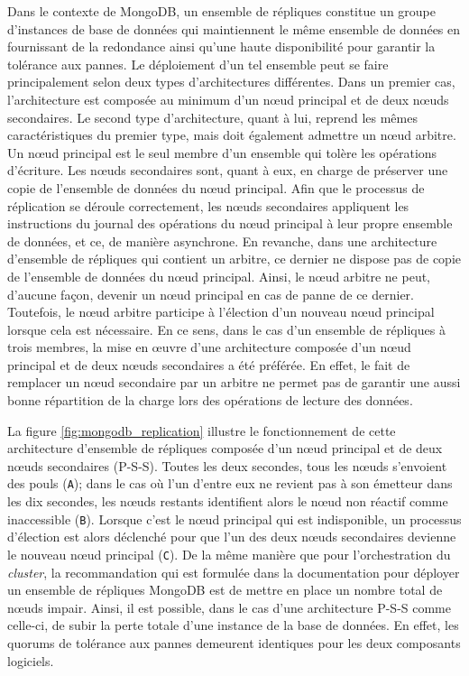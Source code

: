 Dans le contexte de MongoDB, un ensemble de répliques constitue un groupe d'instances de base de données qui maintiennent le même ensemble de données en fournissant de la redondance ainsi qu'une haute disponibilité pour garantir la tolérance aux pannes. Le déploiement d'un tel ensemble peut se faire principalement selon deux types d'architectures différentes. Dans un premier cas, l'architecture est composée au minimum d'un n\oe{}ud principal et de deux n\oe{}uds secondaires. Le second type d'architecture, quant à lui, reprend les mêmes caractéristiques du premier type, mais doit également admettre un n\oe{}ud arbitre. Un n\oe{}ud principal est le seul membre d'un ensemble qui tolère les opérations d'écriture. Les n\oe{}uds secondaires sont, quant à eux, en charge de préserver une copie de l'ensemble de données du n\oe{}ud principal. Afin que le processus de réplication se déroule correctement, les n\oe{}uds secondaires appliquent les instructions du journal des opérations du n\oe{}ud principal à leur propre ensemble de données, et ce, de manière asynchrone. En revanche, dans une architecture d'ensemble de répliques qui contient un arbitre, ce dernier ne dispose pas de copie de l'ensemble de données du n\oe{}ud principal. Ainsi, le n\oe{}ud arbitre ne peut, d'aucune façon, devenir un n\oe{}ud principal en cas de panne de ce dernier. Toutefois, le n\oe{}ud arbitre participe à l'élection d'un nouveau n\oe{}ud principal lorsque cela est nécessaire. En ce sens, dans le cas d'un ensemble de répliques à trois membres, la mise en \oe{}uvre d'une architecture composée d'un n\oe{}ud principal et de deux n\oe{}uds secondaires a été préférée. En effet, le fait de remplacer un n\oe{}ud secondaire par un arbitre ne permet pas de garantir une aussi bonne répartition de la charge lors des opérations de lecture des données.

La figure \ref{fig:mongodb_replication} illustre le fonctionnement de cette architecture d'ensemble de répliques composée d'un n\oe{}ud principal et de deux n\oe{}uds secondaires (P-S-S). Toutes les deux secondes, tous les n\oe{}uds s'envoient des pouls (\texttt{A}); dans le cas où l'un d'entre eux ne revient pas à son émetteur dans les dix secondes, les n\oe{}uds restants identifient alors le n\oe{}ud non réactif comme inaccessible (\texttt{B}). Lorsque c'est le n\oe{}ud principal qui est indisponible, un processus d'élection est alors déclenché pour que l'un des deux n\oe{}uds secondaires devienne le nouveau n\oe{}ud principal (\texttt{C}). De la même manière que pour l'orchestration du \textit{cluster}, la recommandation qui est formulée dans la documentation pour déployer un ensemble de répliques MongoDB est de mettre en place un nombre total de n\oe{}uds impair. Ainsi, il est possible, dans le cas d'une architecture P-S-S comme celle-ci, de subir la perte totale d'une instance de la base de données. En effet, les quorums de tolérance aux pannes demeurent identiques pour les deux composants logiciels.

